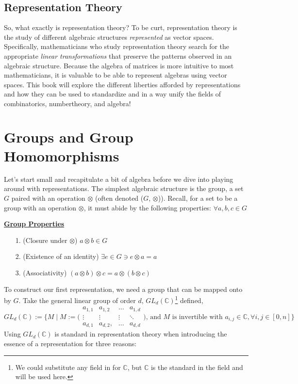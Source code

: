 \documentclass[11pt]{book}
\begin{document}
\subsection{Representation Theory}
So, what exactly is representation theory? To be curt, representation theory is the study of different algebraic 
structures \emph{represented} as vector spaces. Specifically, mathematicians who study representation theory search for 
the appropriate \emph{linear transformations} that preserve the patterns observed in an algebraic structure. Because the 
algebra of matrices is more intuitive to most mathematicians, it is valuable to be able to represent algebras using vector spaces.
This book will explore the different liberties afforded by representations and how they can be used to standardize
and in a way unify the fields of combinatorics, numbertheory, and algebra!\\

\newpage

\section{Groups and Group Homomorphisms}
Let's start small and recapitulate a bit of algebra before we dive into playing around with representations.
The simplest algebraic structure is the group, a set $G$ paired with an operation $\otimes$ (often denoted ($G$, $\otimes$)). 
Recall, for a set to be a group with an operation $\otimes$, it must abide by the following properties: $\forall a,b, c \in G$\\
\begin{defin}
	\begin{center}
		\underline{\textbf{Group Properties}}
		\begin{enumerate}
			\item[1.] (Closure under $\otimes$) $a \otimes b \in G$\\
			\item[2.] (Existence of an identity) $\exists e \in G \ni e \otimes a = a$\\
			\item[3.] (Associativity) $(a \otimes b) \otimes c = a \otimes (b \otimes c)$\\
		\end{enumerate}
	\end{center}
\end{defin}
To construct our first representation, we need a group that can be mapped onto by $G$. Take the general linear group of order $d$, $GL_d(\mathbb{C})$\footnote{
We could substitute any field in for $\mathbb{C}$, but $\mathbb{C}$ is the standard in the field and will be used here.} defined,
$$GL_d(\mathbb{C}) := \Bigg\{M \mid M := \Bigg(\begin{matrix} a_{1,1} & a_{1,2} & \dots & a_{1,d}\\ \vdots & \vdots & \vdots & \ddots\\ a_{d,1} & a_{d, 2},
	& \dots & a_{d,d}\end{matrix}\Bigg) \text{, and $M$ is invertible with } a_{i,j} \in \mathbb{C}, \forall i,j \in [0,n]\Bigg\} $$
Using $GL_d(\mathbb{C})$ is standard in representation theory when introducing the essence of a representation for three reasons:
\end{document}
